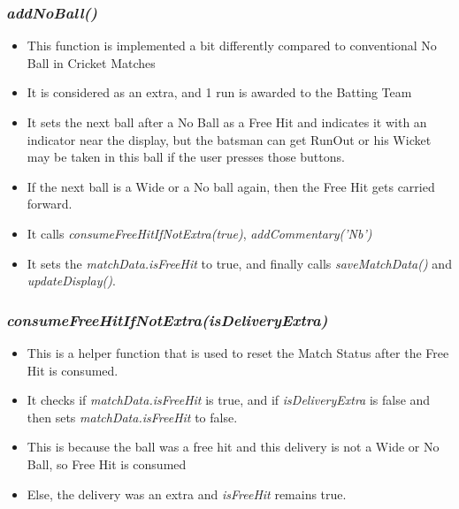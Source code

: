 \documentclass[a4paper,12pt]{article}
\begin{document}
\subsubsection{\textit{addNoBall()}}
\label{noBall1}
\begin{itemize}
\item This function is implemented a bit differently compared to conventional No Ball in Cricket Matches
\item It is considered as an extra, and 1 run is awarded to the Batting Team
\item It sets the next ball after a No Ball as a Free Hit and indicates it with an indicator near the display, but the batsman can get RunOut or his Wicket may be taken in this ball if the user presses those buttons.
\item If the next ball is a Wide or a No ball again, then the Free Hit gets carried forward.
\item It calls \textit{consumeFreeHitIfNotExtra(true)}, \textit{addCommentary('Nb')}
\item It sets the \textit{matchData.isFreeHit} to true, and finally calls \textit{saveMatchData()} and \textit{updateDisplay()}.
\end{itemize}

\subsubsection{\textit{consumeFreeHitIfNotExtra(isDeliveryExtra)}}
\label{noBall2}
\begin{itemize}
\item This is a helper function that is used to reset the Match Status after the Free Hit is consumed.
\item It checks if \textit{matchData.isFreeHit} is true, and if \textit{isDeliveryExtra} is false and then sets \textit{matchData.isFreeHit} to false.
\item This is because the ball was a free hit and this delivery is not a Wide or No Ball, so Free Hit is consumed
\item Else, the delivery was an extra and \textit{isFreeHit} remains true.
\end{itemize}
\end{document}
